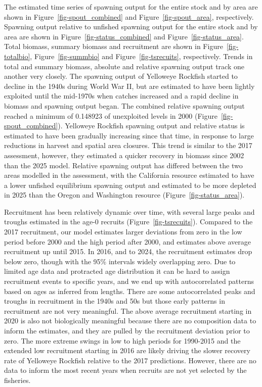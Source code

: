 \documentclass[
]{scrartcl}
\begin{document}
The estimated time series of spawning output for the entire stock and by
area are shown in Figure~\ref{fig-spout_combined} and
Figure~\ref{fig-spout_area}, respectively. Spawning output relative to
unfished spawning output for the entire stock and by area are shown in
Figure~\ref{fig-status_combined} and Figure~\ref{fig-status_area}. Total
biomass, summary biomass and recruitment are shown in
Figure~\ref{fig-totalbio}, Figure~\ref{fig-summbio} and
Figure~\ref{fig-tsrecuits}, respectively. Trends in total and summary
biomass, absolute and relative spawning output track one another very
closely. The spawning output of Yelloweye Rockfish started to decline in
the 1940s during World War II, but are estimated to have been lightly
exploited until the mid-1970s when catches increased and a rapid decline
in biomass and spawning output began. The combined relative spawning
output reached a minimum of 0.148923 of unexploited levels in 2000
(Figure~\ref{fig-spout_combined}). Yelloweye Rockfish spawning output
and relative status is estimated to have been gradually increasing since
that time, in response to large reductions in harvest and spatial area
closures. This trend is similar to the 2017 assessment, however, they
estimated a quicker recovery in biomass since 2002 than the 2025 model.
Relative spawning output has differed between the two areas modelled in
the assessment, with the California resource estimated to have a lower
unfished equilibrium spawning output and estimated to be more depleted
in 2025 than the Oregon and Washington resource
(Figure~\ref{fig-status_area}).

Recruitment has been relatively dynamic over time, with several large
peaks and troughs estimated in the age-0 recruits
(Figure~\ref{fig-tsrecuits}). Compared to the 2017 recruitment, our
model estimates larger deviations from zero in the low period before
2000 and the high period after 2000, and estimates above average
recruitment up until 2015. In 2016, and to 2024, the recruitment
estimates drop below zero, though with the 95\% intervals widely
overlapping zero. Due to limited age data and protracted age
distribution it can be hard to assign recruitment events to specific
years, and we end up with autocorrelated patterns based on ages as
inferred from lengths. There are some autocorrelated peaks and troughs
in recruitment in the 1940s and 50s but those early patterns in
recruitment are not very meaningful. The above average recruitment
starting in 2020 is also not biologically meaningful because there are
no composition data to inform the estimates, and they are pulled by the
recruitment deviation prior to zero. The more extreme swings in low to
high periods for 1990-2015 and the extended low recruitment starting in
2016 are likely driving the slower recovery rate of Yelloweye Rockfish
relative to the 2017 predictions. However, there are no data to inform
the most recent years when recruits are not yet selected by the
fisheries.
\end{document}
